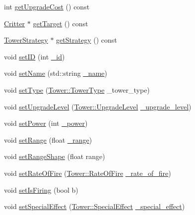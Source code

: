 \begin{DoxyCompactItemize}
\item 
int \hyperlink{class_tower_a6211c9d5d2718c1d65efb0b636e74d77}{get\+Upgrade\+Cost} () const 
\item 
\hyperlink{class_critter}{Critter} $\ast$ \hyperlink{class_tower_ad5d042b8ab67fdcae27ecbd82fb27b0c}{get\+Target} () const 
\item 
\hyperlink{class_tower_strategy}{Tower\+Strategy} $\ast$ \hyperlink{class_tower_afe734b0803dc45f90d59c6dc2d3aa5fe}{get\+Strategy} () const 
\item 
void \hyperlink{class_tower_a2ad5e52d8c8e3c5783b1c3499f19ceca}{set\+I\+D} (int \hyperlink{class_tower_a02ec2f8d1c4dea2f7fc002d8626c8b28}{\+\_\+id})
\item 
void \hyperlink{class_tower_afa5c0c8cb518b93184be21d86d1bfc56}{set\+Name} (std\+::string \hyperlink{class_tower_ac29247d1ed8c97c105f5f1e05fb1f92c}{\+\_\+name})
\item 
void \hyperlink{class_tower_a47ee9428118e95e689950ad605f90cb3}{set\+Type} (\hyperlink{class_tower_a110a21c18d4ec095c6234bd17f004b3e}{Tower\+::\+Tower\+Type} \+\_\+tower\+\_\+type)
\item 
void \hyperlink{class_tower_ac31643b1a10e1821d90583dc9ff03943}{set\+Upgrade\+Level} (\hyperlink{class_tower_a23889cd9ee2fbae0420c97105fd6ebc8}{Tower\+::\+Upgrade\+Level} \hyperlink{class_tower_a0172731487da6a0480901e031e2aecbe}{\+\_\+upgrade\+\_\+level})
\item 
void \hyperlink{class_tower_a89f3c815849be59057c2bcdeb1bb097f}{set\+Power} (int \hyperlink{class_tower_af9e223c165f5632944868df3dfc70bee}{\+\_\+power})
\item 
void \hyperlink{class_tower_a867f4e6b1621fba50fcba5cd1d27f227}{set\+Range} (float \hyperlink{class_tower_a77cd5002dac75320f83fb540a3878936}{\+\_\+range})
\item 
void \hyperlink{class_tower_ab91ce57d4ab80bd2aa03e6f4b68ef1a8}{set\+Range\+Shape} (float range)
\item 
void \hyperlink{class_tower_a954b831038f6fe86e40d0dcd398bd239}{set\+Rate\+Of\+Fire} (\hyperlink{class_tower_ae82ae8201f8921eb64878d2c9ecb5bb2}{Tower\+::\+Rate\+Of\+Fire} \hyperlink{class_tower_a746898a9884a60cf09c5b4d0f1fdac2a}{\+\_\+rate\+\_\+of\+\_\+fire})
\item 
void \hyperlink{class_tower_af1ca7002ff17d468f7b9b3b5e4f99348}{set\+Is\+Firing} (bool b)
\item 
void \hyperlink{class_tower_ac2b7becdd52924a8787cf7de2a62fff5}{set\+Special\+Effect} (\hyperlink{class_tower_a355ab1cbcfd8c4d037ccf8937f784445}{Tower\+::\+Special\+Effect} \hyperlink{class_tower_ad6a84071c2e7f48386443c469961116c}{\+\_\+special\+\_\+effect})

\end{DoxyCompactItemize}
